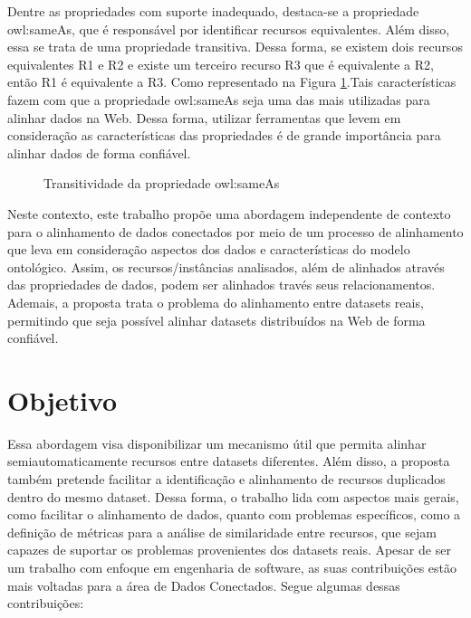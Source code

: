 Dentre as propriedades com suporte inadequado,  destaca-se a propriedade owl:sameAs, que é responsável por identificar recursos equivalentes. Além disso, essa se trata de uma propriedade transitiva. Dessa forma, se existem dois recursos equivalentes R1 e R2 e existe um terceiro recurso R3 que é equivalente a R2, então R1 é equivalente a R3. Como representado na Figura \ref{sameAs}.Tais características fazem com que a propriedade owl:sameAs seja uma das  mais utilizadas para alinhar dados na Web. Dessa forma, utilizar ferramentas que levem em consideração as características das propriedades é de grande importância para alinhar dados de forma confiável.
\begin{figure}[h]
\centering
{}
\caption{Transitividade da propriedade owl:sameAs}
\label{sameAs}
\end{figure}

Neste contexto, este trabalho propõe uma abordagem independente de contexto para o alinhamento de dados conectados por meio de um processo de alinhamento que leva em consideração aspectos dos dados e  características do modelo ontológico. Assim, os recursos/instâncias analisados, além de alinhados através das propriedades de dados, podem ser alinhados través seus relacionamentos. Ademais, a proposta trata o problema do alinhamento entre datasets reais, permitindo que seja possível alinhar datasets distribuídos na Web de forma confiável.

\section{Objetivo}

Essa abordagem visa disponibilizar um mecanismo útil que permita alinhar semiautomaticamente recursos entre datasets diferentes. Além disso, a proposta também pretende facilitar a identificação e alinhamento de recursos duplicados dentro do mesmo dataset.
Dessa forma, o trabalho lida com aspectos mais gerais, como facilitar o alinhamento de dados, quanto com problemas específicos, como a definição de métricas para a análise de similaridade entre recursos, que sejam capazes de suportar os problemas provenientes dos datasets reais. Apesar de ser um trabalho com enfoque em engenharia de software, as suas contribuições estão mais voltadas para a área de Dados Conectados. Segue algumas dessas contribuições:

